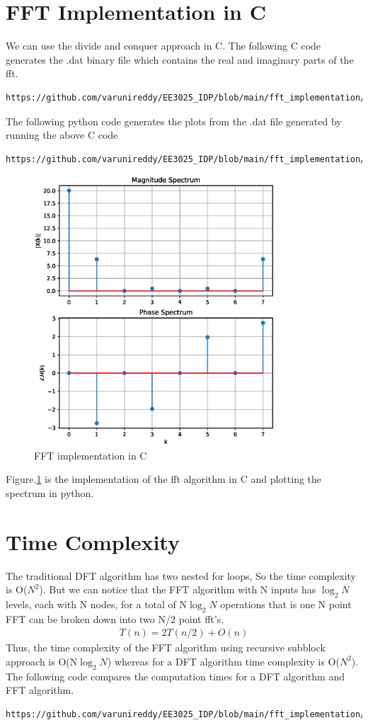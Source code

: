 \documentclass[journal,12pt,twocolumn]{IEEEtran}
\begin{document}
\section{FFT Implementation in C}
We can use the divide and conquer approach in C. The following C code generates the .dat binary file which contains the real and imaginary parts of the fft.\\
\begin{lstlisting}
https://github.com/varunireddy/EE3025_IDP/blob/main/fft_implementation/codes/ee18btech11005.c
\end{lstlisting}
The following python code generates the plots from the .dat file generated by running the above C code
\begin{lstlisting}
https://github.com/varunireddy/EE3025_IDP/blob/main/fft_implementation/codes/read_dat_file.py
\end{lstlisting}
\begin{figure}[!ht]
    \centering
    \includegraphics[width=9cm]{./figs/fft_c.eps}
    \caption{FFT implementation in C}
    \label{fig:fft_c}
\end{figure}
Figure.\ref{fig:fft_c} is the implementation of the fft algorithm in C and plotting the spectrum in python.
\section{Time Complexity}
The traditional DFT algorithm has two nested for loops, So the time complexity is O($N^2$).
But we can notice that the FFT algorithm with N inputs has $\log_2 N$ levels, each with N nodes, for a total of N$\log_2 N$ operations that is one N point FFT can be broken down into two N/2 point fft's. 
\begin{align}
    T(n) = 2T(n/2) + O(n)
\end{align}
Thus, the time complexity of the FFT algorithm using recursive subblock approach is O(N$\log_2 N$) whereas for a DFT algorithm time complexity is O($N^2$).\\
The following code compares the computation times for a DFT algorithm and FFT algorithm.
\begin{lstlisting}
https://github.com/varunireddy/EE3025_IDP/blob/main/fft_implementation/codes/comparetime.py
\end{lstlisting}
\end{document}
